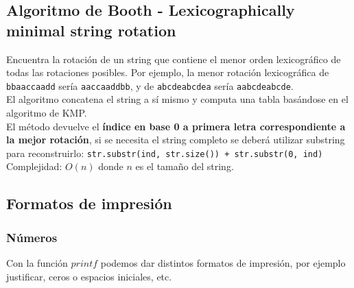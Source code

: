 \documentclass[10pt,letterpaper,twocolumn]{article}
\newcommand{\source}[1]{
  
  \dotfill
}
\begin{document}
  \subsection{Algoritmo de Booth - Lexicographically minimal string rotation}
    Encuentra la rotación de un string que contiene el menor orden lexicográfico de todas las rotaciones posibles. Por ejemplo, la menor rotación lexicográfica de \texttt{bbaaccaadd} sería \texttt{aaccaaddbb}, y de \texttt{abcdeabcdea} sería \texttt{aabcdeabcde}. \\
    El algoritmo concatena el string a sí mismo y computa una tabla basándose en el algoritmo de KMP.\\
    El método devuelve el \textbf{índice en base 0 a primera letra correspondiente a la mejor rotación}, si se necesita el string completo se deberá utilizar substring para reconstruirlo: \texttt{str.substr(ind, str.size()) + str.substr(0, ind)}\\
Complejidad: $O(n)$ donde $n$ es el tamaño del string.
    \source{./src/booths.cpp}

  \subsection{Formatos de impresión}
    \subsubsection{Números}
    Con la función $printf$ podemos dar distintos formatos de impresión, por ejemplo justificar, ceros o espacios iniciales, etc.
      \source{./src/printFormat.cpp}
\end{document}
